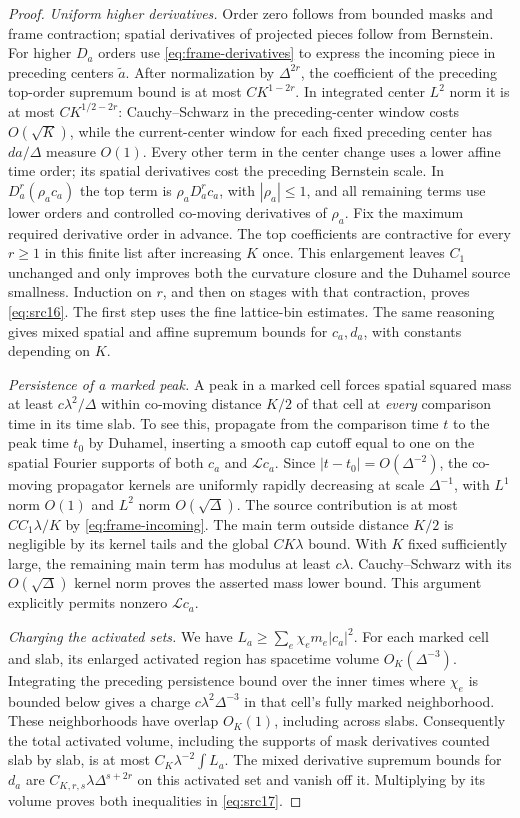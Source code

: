 \begin{proof}
\emph{Uniform higher derivatives.}
Order zero follows from bounded masks and frame contraction; spatial
derivatives of projected pieces follow from Bernstein.  For higher
$D_a$ orders use \eqref{eq:frame-derivatives} to express the incoming
piece in preceding centers $\widetilde a$.  After normalization by
$\Delta^{2r}$, the coefficient of the preceding top-order supremum
bound is at most $CK^{1-2r}$.  In integrated center $L^2$ norm it is
at most $CK^{1/2-2r}$: Cauchy--Schwarz in the preceding-center window
costs $O(\sqrt K)$, while the current-center window for each fixed
preceding center has $da/\Delta$ measure $O(1)$.
Every other term in the center change uses a lower affine time order;
its spatial derivatives cost the preceding Bernstein scale.
In $D_a^r(\rho_ac_a)$ the top term is $\rho_aD_a^rc_a$, with
$|\rho_a|\leq1$, and all remaining terms use lower orders and
controlled co-moving derivatives of $\rho_a$.
Fix the maximum required derivative order in advance.  The top
coefficients are contractive for every $r\geq1$ in this finite list
after increasing $K$ once.  This enlargement leaves $C_1$ unchanged
and only improves both the curvature closure and the Duhamel source
smallness.  Induction on $r$, and then on stages with that
contraction, proves \eqref{eq:src16}.  The first step uses the fine
lattice-bin estimates.  The same reasoning gives mixed spatial and
affine supremum bounds for $c_a,d_a$, with constants depending on $K$.

\emph{Persistence of a marked peak.}
A peak in a marked cell forces spatial squared mass at least
$c\lambda^2/\Delta$ within co-moving distance $K/2$ of that cell at
\emph{every} comparison time in its time slab.  To see this, propagate
from the comparison time $t$ to the peak time $t_0$ by Duhamel, inserting
a smooth cap cutoff equal to one on the spatial Fourier supports of both
$c_a$ and $\mathcal Lc_a$.  Since $|t-t_0|=O(\Delta^{-2})$, the
co-moving propagator kernels are uniformly rapidly decreasing at
scale $\Delta^{-1}$, with $L^1$ norm $O(1)$ and $L^2$ norm
$O(\sqrt\Delta)$.  The source contribution is at most
$CC_1\lambda/K$ by \eqref{eq:frame-incoming}.  The main term outside
distance $K/2$ is negligible by its kernel tails and the global
$CK\lambda$ bound.  With $K$ fixed sufficiently large, the remaining
main term has modulus at least $c\lambda$.  Cauchy--Schwarz with its
$O(\sqrt\Delta)$ kernel norm proves the asserted mass lower bound.
This argument explicitly permits nonzero $\mathcal Lc_a$.

\emph{Charging the activated sets.}
We have $L_a\geq\sum_e\chi_em_e|c_a|^2$.  For each marked cell and
slab, its enlarged activated region has spacetime volume
$O_K(\Delta^{-3})$.  Integrating the preceding persistence bound over
the inner times where $\chi_e$ is bounded below gives a charge
$c\lambda^2\Delta^{-3}$ in that cell's fully marked neighborhood.
These neighborhoods have overlap $O_K(1)$, including across slabs.
Consequently the total activated volume, including the supports of
mask derivatives counted slab by slab, is at most
$C_K\lambda^{-2}\int L_a$.
The mixed derivative supremum bounds for $d_a$ are
$C_{K,r,s}\lambda\Delta^{s+2r}$ on this activated set and vanish
off it.  Multiplying by its volume proves both inequalities in
\eqref{eq:src17}.


\end{proof}
